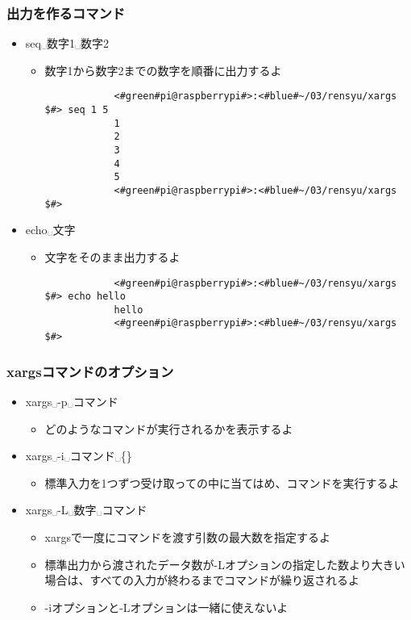 \begin{frame}[fragile]
    \frametitle{出力を作るコマンド}
    \begin{itemize}
        \item seq␣数字1␣数字2
        \begin{itemize}
            \item 数字1から数字2までの数字を順番に出力するよ
            \begin{lstlisting}
            <#green#pi@raspberrypi#>:<#blue#~/03/rensyu/xargs $#> seq 1 5
            1
            2
            3
            4
            5
            <#green#pi@raspberrypi#>:<#blue#~/03/rensyu/xargs $#>
            \end{lstlisting}
        \end{itemize}
        \item echo␣文字
        \begin{itemize}
            \item 文字をそのまま出力するよ
            \begin{lstlisting}
            <#green#pi@raspberrypi#>:<#blue#~/03/rensyu/xargs $#> echo hello
            hello
            <#green#pi@raspberrypi#>:<#blue#~/03/rensyu/xargs $#>
            \end{lstlisting}
        \end{itemize}
    \end{itemize}
\end{frame}

\begin{frame}
    \frametitle{xargsコマンドのオプション}
    \begin{itemize}
        \item xargs␣-p␣コマンド
        \begin{itemize}
            \item どのようなコマンドが実行されるかを表示するよ
        \end{itemize}
        \item xargs␣-i␣コマンド␣\{\}
        \begin{itemize}
            \item 標準入力を1つずつ受け取って{}の中に当てはめ、コマンドを実行するよ
        \end{itemize}
        \item xargs␣-L␣数字␣コマンド
        \begin{itemize}
            \item xargsで一度にコマンドを渡す引数の最大数を指定するよ
            \item 標準出力から渡されたデータ数が-Lオプションの指定した数より大きい場合は、すべての入力が終わるまでコマンドが繰り返されるよ
            \item -iオプションと-Lオプションは一緒に使えないよ
        \end{itemize}
    \end{itemize}
\end{frame}

